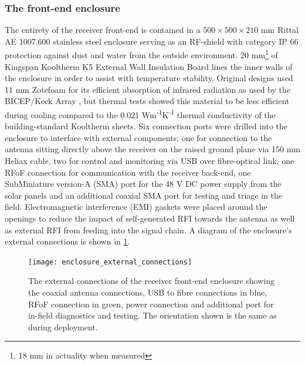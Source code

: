 \subsubsection{The front-end enclosure}
The entirety of the receiver front-end is contained in a $500 \times 500 \times 210$ mm Rittal AE 1007.600 stainless steel enclosure serving as an RF-shield with category IP 66 protection against dust and water from the outside environment. 20 mm\footnote{18 mm in actuality when measured} of Kingspan Kooltherm K5 External Wall Insulation Board lines the inner walls of the enclosure in order to assist with temperature stability. Original designs used 11 mm Zotefoam for its efficient absorption of infrared radiation as used by the BICEP/Keck Array \citep{bicep}, but thermal tests showed this material to be less efficient during cooling compared to the 0.021 Wm\textsuperscript{-1}K\textsuperscript{-1} thermal conductivity of the building-standard Kooltherm sheets. Six connection ports were drilled into the enclosure to interface with external components; one for connection to the antenna sitting directly above the receiver on the raised ground plane via 150 mm Heliax cable, two for control and monitoring via USB over fibre-optical link, one RFoF connection for communication with the receiver back-end, one SubMiniature version-A (SMA) port for the 48 V DC power supply from the solar panels and an additional coaxial SMA port for testing and triage in the field. Electromagnetic interference (EMI) gaskets were placed around the openings to reduce the impact of self-generated RFI towards the antenna as well as external RFI from feeding into the signal chain. A diagram of the enclosure’s external connections is shown in \cref{fig:enclosure_external_connections}.
\begin{figure}
    \centering
    \texttt{[image: enclosure\_external\_connections]}
    \caption{The external connections of the receiver front-end enclosure showing the coaxial antenna connections, USB to fibre connections in blue, RFoF connection in green, power connection and additional port for in-field diagnostics and testing. The orientation shown is the same as during deployment.}
\label{fig:enclosure_external_connections}
\end{figure}

